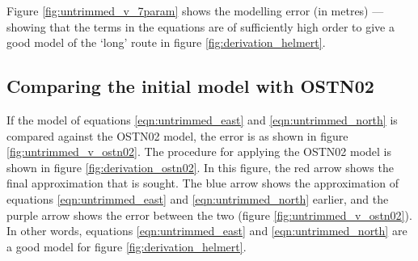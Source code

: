 \documentclass[10pt,a4paper]{article}
\begin{document}
Figure \ref{fig:untrimmed_v_7param} shows the modelling error (in metres) ---
showing that the terms in the equations are of sufficiently high order to give
a good model of the `long' route in figure \ref{fig:derivation_helmert}.

\subsection{Comparing the initial model with OSTN02}

If the model of equations \eqref{eqn:untrimmed_east} and
\eqref{eqn:untrimmed_north} is compared against the OSTN02 model, the error is
as shown in figure \ref{fig:untrimmed_v_ostn02}.  The procedure for applying
the OSTN02 model is shown in figure \ref{fig:derivation_ostn02}.  In this
figure, the red arrow shows the final approximation that is sought.  The blue
arrow shows the approximation of equations \eqref{eqn:untrimmed_east} and
\eqref{eqn:untrimmed_north} earlier, and the purple arrow shows the error
between the two (figure \ref{fig:untrimmed_v_ostn02}).  In other words,
equations \eqref{eqn:untrimmed_east} and \eqref{eqn:untrimmed_north} are a good
model for figure \ref{fig:derivation_helmert}.
\end{document}
